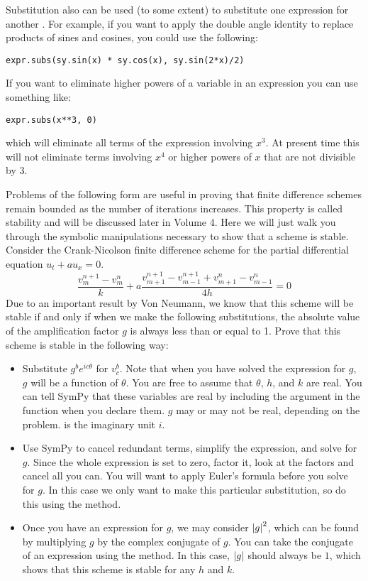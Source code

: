 Substitution also can be used (to some extent) to substitute one expression for another .
For example, if you want to apply the double angle identity to replace products of sines and cosines, you could use the following:
\begin{lstlisting}
expr.subs(sy.sin(x) * sy.cos(x), sy.sin(2*x)/2)
\end{lstlisting}
If you want to eliminate higher powers of a variable in an expression you can use something like:
\begin{lstlisting}
expr.subs(x**3, 0)
\end{lstlisting}
which will eliminate all terms of the expression involving $x^3$.
At present time this will not eliminate terms involving $x^4$ or higher powers of $x$ that are not divisible by 3.

\begin{problem}
Problems of the following form are useful in proving that finite difference schemes remain bounded as the number of iterations increases.
This property is called stability and will be discussed later in Volume 4.
Here we will just walk you through the symbolic manipulations necessary to show that a scheme is stable.
Consider the Crank-Nicolson finite difference scheme for the partial differential equation $u_t+a u_x=0$.
\begin{equation*}
\frac{v_{m}^{n+1}-v_{m}^{n}}{k}+a\frac{v_{m+1}^{n+1}-v_{m-1}^{n+1}+v_{m+1}^{n}-v_{m-1}^{n}}{4h}=0
\end{equation*}
Due to an important result by Von Neumann, we know that this scheme will be stable if and only if when we make the following substitutions, the absolute value of the amplification factor $g$ is always less than or equal to 1.
Prove that this scheme is stable in the following way:
\begin{itemize}
\item Substitute $g^b e^{i c \theta}$ for $v_c^b$.
Note that when you have solved the expression for $g$, $g$ will be a function of $\theta$.
You are free to assume that $\theta$, $h$, and $k$ are real.
You can tell SymPy that these variables are real by including the argument  in the  function when you declare them.
$g$ may or may not be real, depending on the problem.
 is the imaginary unit $i$.
\item Use SymPy to cancel redundant terms, simplify the expression, and solve for $g$.
Since the whole expression is set to zero, factor it, look at the factors and cancel all you can.
You will want to apply Euler's formula before you solve for $g$.
In this case we only want to make this particular substitution, so do this using the  method.
\item Once you have an expression for $g$, we may consider $\left\lvert g\right\rvert^2$, which can be found by multiplying $g$ by the complex conjugate of $g$.
You can take the conjugate of an expression using the  method.
In this case, $\left\lvert g\right\rvert$ should always be $1$, which shows that this scheme is stable for any $h$ and $k$.
\end{itemize}
\end{problem}

